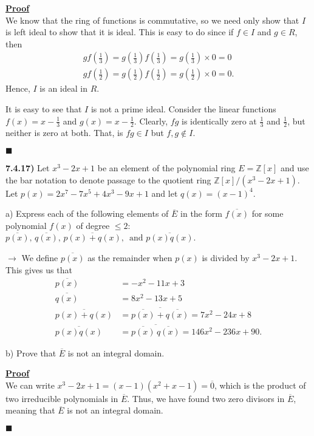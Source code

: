 \documentclass[12pt,a4paper]{article}
\newcommand{\prob}[2]{\textbf{#1)} #2}
\newenvironment{proof}
{
\textbf{\underline{Proof}} \\
}
{
\hfill $\blacksquare$
}
\begin{document}
\begin{proof}
    We know that the ring of functions is commutative, so we need only show that $I$ is left ideal to show that it is ideal.
    This is easy to do since if $f \in I$ and $g \in R$, then
    \begin{align*}
        gf\left( \frac{1}{3} \right) = g\left(\frac{1}{3}\right)f\left(\frac{1}{3}\right) = g\left(\frac{1}{3}\right) \times 0 = 0 \\
        gf\left(\frac{1}{2}\right) = g\left(\frac{1}{2}\right)f\left(\frac{1}{2}\right) = g\left(\frac{1}{2}\right) \times 0 = 0 
    .\end{align*}
    Hence, $I$ is an ideal in $R$.

    It is easy to see that $I$ is not a prime ideal.
    Consider the linear functions $f(x) = x - \frac{1}{3}$ and $g(x) = x - \frac{1}{2}$.
    Clearly, $fg$ is identically zero at $\frac{1}{3}$ and $\frac{1}{2}$, but neither is zero at both.
    That, is $fg \in I$ but $f,g \not\in I$.
\end{proof}

\prob{7.4.17}{
    Let $x^3 - 2x + 1$ be an element of the polynomial ring $E = \mathbb{Z}[x]$ and use the bar notation to denote passage to the quotient ring $\mathbb{Z}[x]/(x^3 - 2x + 1)$.
    Let $p(x) = 2x^7 - 7x^5 + 4x^3 - 9x + 1$ and let $q(x) = \left( x - 1 \right)^{4}$.
}

a) Express each of the following elements of $\overline{E}$ in the form $\overline{f(x)}$ for some polynomial $f(x)$ of degree $\leq 2$: $\overline{p(x)},\,\overline{q(x)},\,\overline{p(x) + q(x)},\,\text{ and } \overline{p(x)q(x)}$.

$\rightarrow$ We define $\overline{p(x)}$ as the remainder when $p(x)$ is divided by $x^3 - 2x + 1$.
This gives us that 
\begin{align*}
    \overline{p(x)} &= -x^2 - 11x + 3 \\
    \overline{q(x)} &= 8x^2 - 13x + 5 \\
    \overline{p(x) + q(x)} &= \overline{\overline{p(x)} + \overline{q(x)}} = 7x^2 - 24x + 8 \\
    \overline{p(x)q(x)} &= \overline{\overline{p(x)}\,\overline{q(x)}} = 146x^2 - 236x + 90 
.\end{align*}

b) Prove that $\overline{E}$ is not an integral domain.

\begin{proof}
    We can write $x^3 - 2x + 1 = \left( x-1 \right)\left( x^2 + x - 1 \right) = \overline{0}$, which is the product of two irreducible polynomials in $\overline{E}$.
    Thus, we have found two zero divisors in $\overline{E}$, meaning that $\overline{E}$ is not an integral domain.
\end{proof}
\end{document}
